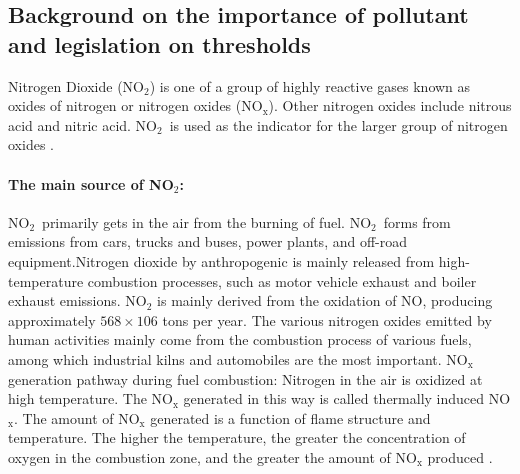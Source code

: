 \documentclass[a4paper,12pt,reqno]{article}
\begin{document}
\vspace{-0.5cm}
\subsection*{Background on the importance of pollutant and legislation on thresholds}
    Nitrogen Dioxide (NO$_2$) is one of a group of 
    highly reactive gases known as oxides of nitrogen 
    or nitrogen oxides (NO$_{\mathrm{x}}$). Other 
    nitrogen oxides include nitrous acid and nitric 
    acid. NO$_2$ is used as the indicator for the 
    larger group of nitrogen oxides \cite{Basic_Information_about_NO2}. 
    \paragraph{The main source of NO$_2$:}
    NO$_2$ primarily gets in the air from the burning of fuel. 
    NO$_2$ forms from emissions from cars, trucks and buses, 
    power plants, and off-road equipment.Nitrogen 
    dioxide by anthropogenic is mainly released 
    from high-temperature combustion processes, such as 
    motor vehicle exhaust and boiler exhaust emissions. 
    NO$_2$ is mainly derived from the oxidation of NO, producing 
    approximately $568\times106$ tons per year. The various nitrogen 
    oxides emitted by human activities mainly come from the 
    combustion process of various fuels, among which industrial 
    kilns and automobiles are the most important. 
    NO$_{\mathrm{x}}$ generation 
    pathway during fuel combustion: Nitrogen in the air is 
    oxidized at high temperature. The NO$_{\mathrm{x}}$ 
    generated in this way 
    is called thermally induced NO$_{\mathrm{x}}$. 
    The amount of NO$_{\mathrm{x}}$ generated 
    is a function of flame structure and temperature. The 
    higher the temperature, the greater the concentration of 
    oxygen in the combustion zone, and the greater the amount 
    of NO$_{\mathrm{x}}$ produced \cite{Baidu_oxides}.
\end{document}
